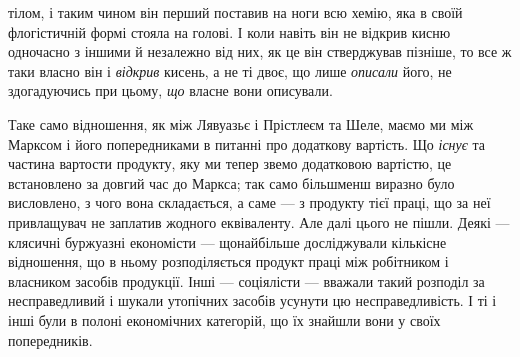 \parcont{}  %
тілом, і таким чином він перший поставив на ноги всю хемію, яка в
своїй флогістичній формі стояла на голові. І коли навіть він не відкрив
кисню одночасно з іншими й незалежно від них, як це він стверджував
пізніше, то все ж таки власно він і \emph{відкрив} кисень, а не ті двоє, що
лише \emph{описали} його, не здогадуючись при цьому, \emph{що} власне вони
описували.

Таке само відношення, як між Лявуазьє і Прістлеєм та Шеле, маємо
ми між Марксом і його попередниками в питанні про додаткову вартість.
Що \emph{існує} та частина вартости продукту, яку ми тепер звемо додатковою
вартістю, це встановлено за довгий час до Маркса; так само більшменш
виразно було висловлено, з чого вона складається, а саме —
з продукту тієї праці, що за неї привлащувач не заплатив жодного еквіваленту.
Але далі цього не пішли. Деякі — клясичні буржуазні економісти —
щонайбільше досліджували кількісне відношення, що в ньому розподіляється
продукт праці між робітником і власником засобів продукції.
Інші — соціялісти — вважали такий розподіл за несправедливий і шукали
утопічних засобів усунути цю несправедливість. І ті і інші були в полоні
економічних категорій, що їх знайшли вони у своїх попередників.

